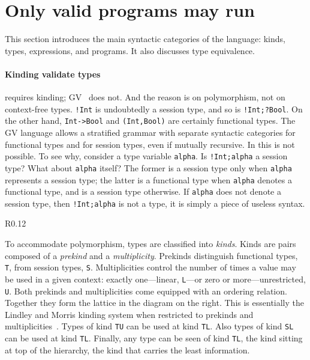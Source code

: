 \section{Only valid programs may run}
\label{sec:valid}

This section introduces the main syntactic categories of the language:
kinds, types, expressions, and programs. It also discusses type
equivalence.

\paragraph{Kinding validate types}

\freest{} requires kinding; GV~\cite{DBLP:journals/acta/GayH05} does
not. And the reason is on polymorphism, not on context-free types.
%
\lstinline|!Int| is undoubtedly a session type, and so is
\lstinline|!Int;?Bool|. On the other hand, \lstinline|Int->Bool| and
\lstinline|(Int,Bool)| are certainly functional types. The GV language
allows a stratified grammar with separate syntactic categories for
functional types and for session types, even if mutually recursive.
%
In \freest{} this is not possible.  To see why, consider a type
variable \lstinline|alpha|. Is \lstinline|!Int;alpha| a session type?
What about \lstinline|alpha| itself? The former is a session type only
when \lstinline|alpha| represents a session type; the latter is a
functional type when \lstinline|alpha| denotes a functional type, and
is a session type otherwise. If \lstinline|alpha| does not denote a
session type, then \lstinline|!Int;alpha| is not a type, it is simply
a piece of useless syntax.

\begin{wrapfigure}{R}{0.12\textwidth}
\end{wrapfigure}
%
To accommodate polymorphism, types are classified into \emph{kinds}.
%
Kinds are pairs composed of a \emph{prekind} and a
\emph{multiplicity}. Prekinds distinguish functional types,
\lstinline|T|, from session types, \lstinline|S|.
%
Multiplicities control the number of times a value may be used in a
given context: exactly one---linear, \lstinline|L|---or zero or
more---unrestricted, \lstinline|U|. Both prekinds and multiplicities
come equipped with an ordering relation. Together they form the
lattice in the diagram on the right.
%
This is essentially the Lindley and Morris kinding system when
restricted to prekinds and
multiplicities~\cite{Lindley.Morris_Lightweight.functional.session.types}.
%
Types of kind \lstinline|TU| can be used at kind \lstinline|TL|. Also
types of kind \lstinline|SL| can be used at kind \lstinline|TL|.
Finally, any type can be seen of kind \lstinline|TL|, the kind sitting
at top of the hierarchy, the kind that carries the least information.

